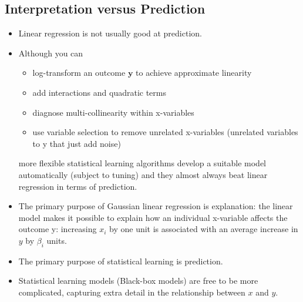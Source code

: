 \documentclass[12pt, oneside]{article}
\newcommand*{\by}{\bm{y}}
\begin{document}
\subsection{Interpretation versus Prediction}
\begin{itemize}
    \item Linear regression is not usually good at prediction.
    \item Although you can 
    \begin{itemize}
        \item log-transform an outcome $\by$ to achieve approximate linearity
        \item add interactions and quadratic terms
        \item diagnose multi-collinearity within x-variables
        \item use variable selection to remove unrelated x-variables (unrelated variables to y that just add noise)
    \end{itemize}
    more flexible statistical learning algorithms develop a suitable model automatically (subject to tuning) and they almost always beat linear regression in terms of prediction.
    \item The primary purpose of Gaussian linear regression is explanation: the linear model makes it possible to explain how an individual x-variable affects the outcome y: increasing $x_i$ by one unit is associated with an average increase in $y$ by $\beta_i$ units.
    \item The primary purpose of statistical learning is prediction.
    \item Statistical learning models (Black-box models) are free to be more complicated, capturing extra detail in the relationship between $x$ and $y$.
\end{itemize}
\end{document}
